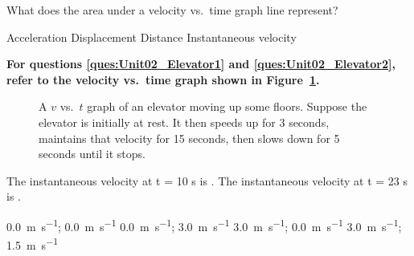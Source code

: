 \documentclass[addpoints]{exam}
\begin{document}
\begin{questions}
\question
What does the area under a velocity vs.~time graph line represent?

\begin{choices}
\choice Acceleration
\CorrectChoice Displacement
\choice Distance
\choice Instantaneous velocity
\end{choices}

\begin{EnvUplevel}
\textbf{For questions \ref{ques:Unit02_Elevator1} and \ref{ques:Unit02_Elevator2}, refer to the velocity vs.~time graph shown in Figure~\ref{fig:Unit02_Fig2.20}.}
\end{EnvUplevel}

\begin{figure}[h!]
    \centering
    \caption{A $v$ vs.~$t$ graph of an elevator moving up some floors. Suppose the elevator is initially at rest. It then speeds up for 3 seconds, maintains that velocity for 15 seconds, then slows down for 5 seconds until it stops.}
    \label{fig:Unit02_Fig2.20}
\end{figure}

\question \label{ques:Unit02_Elevator1}

The instantaneous velocity at t = 10 s is \underline{\hspace{2cm}}. The instantaneous velocity at t = 23 s is \underline{\hspace{2cm}}.

\begin{choices}
\choice \SI[per-mode=symbol]{0.0}{\meter\per\second}; \SI[per-mode=symbol]{0.0}{\meter\per\second}
\choice \SI[per-mode=symbol]{0.0}{\meter\per\second}; \SI[per-mode=symbol]{3.0}{\meter\per\second}
\CorrectChoice \SI[per-mode=symbol]{3.0}{\meter\per\second}; \SI[per-mode=symbol]{0.0}{\meter\per\second}
\choice \SI[per-mode=symbol]{3.0}{\meter\per\second}; \SI[per-mode=symbol]{1.5}{\meter\per\second}
\end{choices}


\end{questions}
\end{document}
